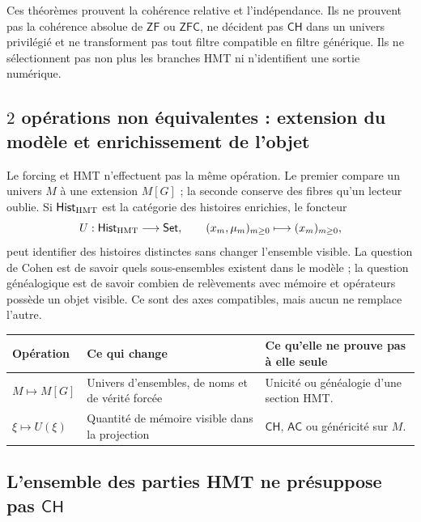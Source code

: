 \begin{remark}
Ces théorèmes prouvent la cohérence relative et l'indépendance. Ils ne prouvent pas la
cohérence absolue de \(\mathsf{ZF}\) ou \(\mathsf{ZFC}\), ne décident pas
\(\mathsf{CH}\) dans un univers privilégié et ne transforment pas tout filtre
compatible en filtre générique. Ils ne sélectionnent pas non plus les branches HMT ni
n'identifient une sortie numérique.
\end{remark}

\subsection{\(2\) opérations non équivalentes : extension du modèle et enrichissement de l'objet}

Le forcing et HMT n'effectuent pas la même opération. Le premier compare un
univers \(M\) à une extension \(M[G]\) ; la seconde conserve des fibres qu'un
lecteur oublie. Si \(\mathsf{Hist}_{\rm HMT}\) est la catégorie des histoires
enrichies, le foncteur
\[
  U:\mathsf{Hist}_{\rm HMT}\longrightarrow\mathsf{Set},
  \qquad
  (x_m,\mu_m)_{m\ge0}\longmapsto(x_m)_{m\ge0},
\]
peut identifier des histoires distinctes sans changer l'ensemble visible. La
question de Cohen est de savoir quels sous-ensembles existent dans le modèle ; la question
généalogique est de savoir combien de relèvements avec mémoire et opérateurs possède un objet
visible. Ce sont des axes compatibles, mais aucun ne remplace l'autre.

\begin{center}
\begin{tabularx}{.94\textwidth}{>{\bfseries}p{}XX}
\toprule
Opération & Ce qui change & Ce qu'elle ne prouve pas à elle seule\\
\midrule
\(M\mapsto M[G]\) & Univers d'ensembles, de noms et de vérité forcée &
Unicité ou généalogie d'une section HMT.\\
\(\xi\mapsto U(\xi)\) & Quantité de mémoire visible dans la projection &
\(\mathsf{CH}\), \(\mathsf{AC}\) ou généricité sur \(M\).\\
\bottomrule
\end{tabularx}
\end{center}

\subsection{L'ensemble des parties HMT ne présuppose pas \texorpdfstring{\(\mathsf{CH}\)}{CH}}

